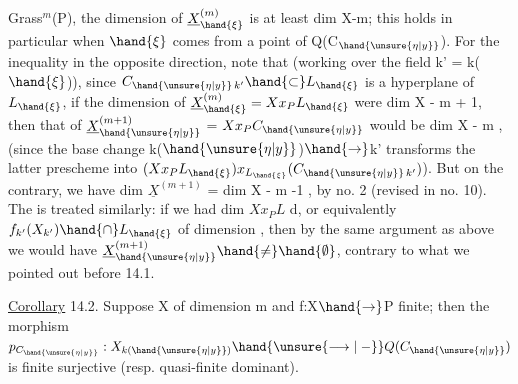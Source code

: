 
Grass$^{m}$(P), the dimension of $\underline{X}^{(m)}_{\hand{\xi}}$ is at least dim X-m; this holds
in particular when $\hand{\xi}$ comes from a point of Q(C$_{\hand{\unsure{\eta|y}}}$). For the inequality
in the opposite direction, note that (working over the field k' = k($\hand{\xi}$)),
since $C_{\hand{\unsure{\eta|y}}\,k'} \hand{\subset} L_{\hand{\xi}}$ is  a hyperplane of $L_{\hand{\xi}}$, if the dimension of
$\underline{X}^{(m)}_{\hand{\xi}} = Xx_{P}L_{\hand{\xi}}$ were \hand{$\geqslant$} dim X - m + 1, then that of $\underline{X}^{(m+1)}_{\hand{\unsure{\eta|y}}}$ =
$Xx_{P}C_{\hand{\unsure{\eta|y}}}$ would be \hand{$\geqslant$} dim X - m , (since the base change k($\hand{\unsure{\eta|y}}$)$\hand{\to}$k'
transforms the latter prescheme into $(Xx_{P}L_{\hand{\xi}})x_{L_{\hand{\xi}}}(C_{\hand{\unsure{\eta|y}}\,k'})$). But on the
contrary, we have  dim $\underline{X}^{(m+1)}$ = dim X - m -1 
, by no. 2 (revised in no. 10).
The   is treated
similarly: if we had dim $Xx_{P}L$ \hand{$\geqslant$} d,  or
equivalently  $f_{k'}(X_{k'}) \hand{\cap} L_{\hand{\xi}}$ of dimension \hand{$\geqslant$},
then by the same argument as  above we would have
$\underline{X}^{(m+1)}_{\hand{\unsure{\eta|y}}} \hand{\neq} \hand{\emptyset}$, contrary to what we pointed out before 14.1.

\uline{Corollary} 14.2. Suppose X of dimension m and f:X$\hand{\to}$P finite; then
the morphism $p_{C_{\hand{\unsure{\eta|y}}}} : X_{k(\hand{\unsure{\eta|y}})} \hand{\unsure{\longrightarrow|\relbar}} Q(C_{\hand{\unsure{\eta|y}}})$ is finite surjective (resp. quasi-finite
dominant).

